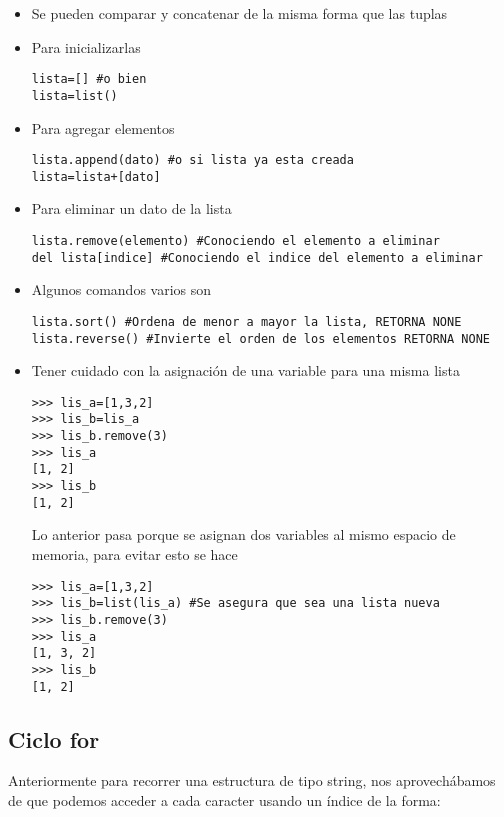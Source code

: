 \begin{itemize}
    \item Se pueden comparar y concatenar de la misma forma que las tuplas
    \item Para inicializarlas
\begin{lstlisting}[style=consola]
lista=[] #o bien
lista=list()
\end{lstlisting}
    \item Para agregar elementos
\begin{lstlisting}[style=consola]
lista.append(dato) #o si lista ya esta creada
lista=lista+[dato]
\end{lstlisting}
 
    \item Para eliminar un dato de la lista
\begin{lstlisting}[style=consola]
lista.remove(elemento) #Conociendo el elemento a eliminar
del lista[indice] #Conociendo el indice del elemento a eliminar
\end{lstlisting}

    \item Algunos comandos varios son 
\begin{lstlisting}[style=consola]
lista.sort() #Ordena de menor a mayor la lista, RETORNA NONE
lista.reverse() #Invierte el orden de los elementos RETORNA NONE
\end{lstlisting}

    \item Tener cuidado con la asignación de una variable para una misma lista

\begin{lstlisting}[style=consola]
>>> lis_a=[1,3,2]
>>> lis_b=lis_a
>>> lis_b.remove(3)
>>> lis_a
[1, 2]
>>> lis_b
[1, 2]
\end{lstlisting}
Lo anterior pasa porque se asignan dos variables al mismo espacio de memoria, para evitar esto se hace
\begin{lstlisting}[style=consola]
>>> lis_a=[1,3,2]
>>> lis_b=list(lis_a) #Se asegura que sea una lista nueva
>>> lis_b.remove(3)
>>> lis_a
[1, 3, 2]
>>> lis_b
[1, 2]
\end{lstlisting}

\end{itemize}

\subsection*{Ciclo for}

Anteriormente para recorrer una estructura de tipo string, nos aprovechábamos de que podemos acceder a cada caracter usando un índice de la forma:

